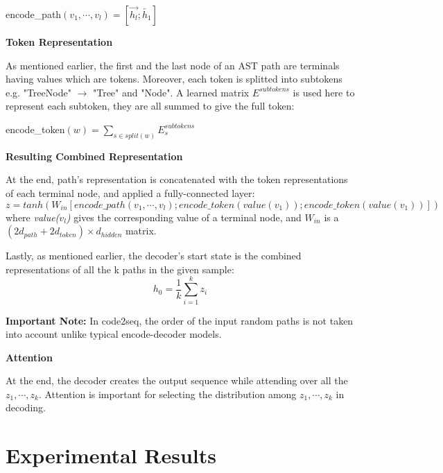 \documentclass[11pt]{article}
\begin{document}
\begin{center}
    encode\_path$(v_1, \cdots, v_l) = [\overrightarrow{h_l}; \overleftarrow{h_1}]$
\end{center}
\newline
\newline
\textbf{Token Representation}

As mentioned earlier, the first and the last node of an AST path are terminals having values which are tokens. Moreover, each token is splitted into subtokens e.g. "TreeNode" $\rightarrow$ "Tree" and "Node". A learned matrix $E^{subtokens}$ is used here to represent each subtoken, they are all summed to give the full token:
\begin{center}
    encode\_token$(w) = \sum_{s \in split(w)} E_s^{subtokens}$
\end{center}
\newline
\newline
\textbf{Resulting Combined Representation}

At the end, path's representation is concatenated with the token representations of each terminal node, and applied a fully-connected layer:
\begin{equation*}
    z = tanh(W_{in}[encode\_path(v_1, \cdots, v_l); encode\_token(value(v_1));encode\_token(value(v_1))])
\end{equation*}
where \textit{value($v_l$)} gives the corresponding value of a terminal node, and $W_{in}$ is a $(2d_{path} + 2d_{token}) \times d_{hidden}$ matrix.

Lastly, as mentioned earlier, the decoder's start state is the combined representations of all the k paths in the given sample:
\begin{equation*}
    h_0 = \frac{1}{k} \sum_{i=1}^k z_i
\end{equation*}

\textbf{Important Note:} In code2seq, the order of the input random paths is not taken into account unlike typical encode-decoder models.
\newpage

\textbf{Attention}

At the end, the decoder creates the output sequence while attending over all the $z_1, \cdots, z_k$. Attention is important for selecting the distribution among $z_1, \cdots, z_k$ in decoding.

\section{Experimental Results}
\end{document}
